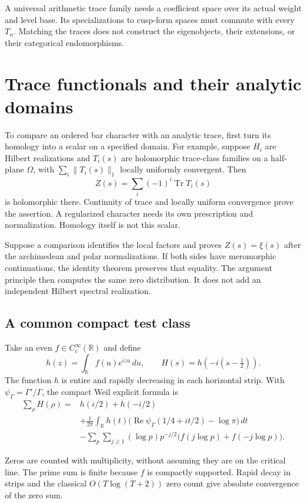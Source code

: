A universal arithmetic trace family needs a coefficient space over its
actual weight and level base. Its specializations to cusp-form spaces must
commute with every $T_n$. Matching the traces does not construct the
eigenobjects, their extensions, or their categorical endomorphisms.

\section{Trace functionals and their analytic domains}

To compare an ordered bar character with an analytic trace, first turn its
homology into a scalar on a specified domain. For example, suppose $H_i$ are
Hilbert realizations and $T_i(s)$ are holomorphic trace-class families on a
half-plane $\Omega$, with $\sum_i\|T_i(s)\|_1$ locally uniformly convergent.
Then
\[
 Z(s)=\sum_i(-1)^i\operatorname{Tr}T_i(s)
\]
is holomorphic there. Continuity of trace and locally uniform convergence
prove the assertion. A regularized character needs its own prescription and
normalization. Homology itself is not this scalar.

Suppose a comparison identifies the local factors and proves $Z(s)=\xi(s)$
after the archimedean and polar normalizations. If both sides have
meromorphic continuations, the identity theorem preserves that equality. The
argument principle then computes the same zero distribution. It does not add
an independent Hilbert spectral realization.

\subsection{A common compact test class}

Take an even $f\in C_c^\infty(\mathbb R)$ and define
\[
 h(z)=\int_{\mathbb R}f(u)e^{izu}\,du,\qquad
 H(s)=h(-i(s-\tfrac12)).
\]
The function $h$ is entire and rapidly decreasing in each horizontal strip.
With $\psi_\Gamma=\Gamma'/\Gamma$, the compact Weil explicit formula is
\begin{align*}
 \sum_\rho H(\rho)={}&h(i/2)+h(-i/2)\\
 &+\frac1{2\pi}\int_{\mathbb R}h(t)
       \bigl(\operatorname{Re}\psi_\Gamma(1/4+it/2)
                              -\log\pi\bigr)\,dt\\
 &-\sum_p\sum_{j\geq1}
       (\log p)p^{-j/2}
       \bigl(f(j\log p)+f(-j\log p)\bigr).
\end{align*}

Zeros are counted with multiplicity, without assuming they are on the
critical line. The prime sum is finite because $f$ is compactly supported.
Rapid decay in strips and the classical $O(T\log(T+2))$ zero count give
absolute convergence of the zero sum.


